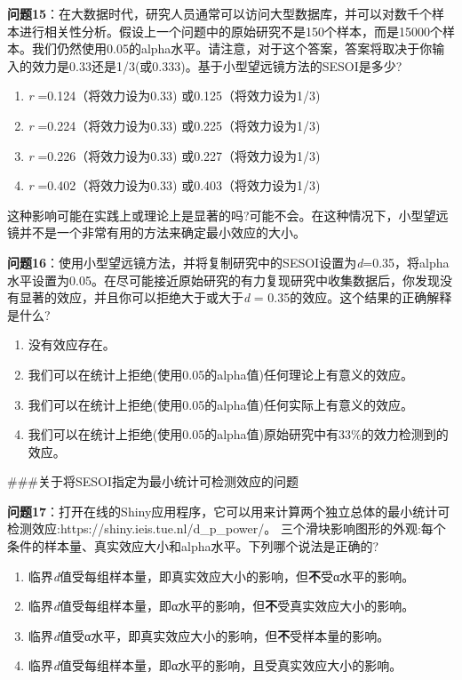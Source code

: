 \documentclass[
  letterpaper,
  DIV=11,
  numbers=noendperiod]{scrreprt}
\providecommand{\tightlist}{%
  \setlength{\itemsep}{0pt}\setlength{\parskip}{0pt}}\usepackage{longtable,booktabs,array}
\begin{document}
\textbf{问题15}：在大数据时代，研究人员通常可以访问大型数据库，并可以对数千个样本进行相关性分析。假设上一个问题中的原始研究不是150个样本，而是15000个样本。我们仍然使用0.05的alpha水平。请注意，对于这个答案，答案将取决于你输入的效力是0.33还是1/3(或0.333)。基于小型望远镜方法的SESOI是多少?

\begin{enumerate}
\def\labelenumi{\Alph{enumi})}
\tightlist
\item
  \emph{r} =0.124（将效力设为0.33) 或0.125（将效力设为1/3)
\item
  \emph{r} =0.224（将效力设为0.33) 或0.225（将效力设为1/3)
\item
  \emph{r} =0.226（将效力设为0.33) 或0.227（将效力设为1/3)
\item
  \emph{r} =0.402（将效力设为0.33) 或0.403（将效力设为1/3)
\end{enumerate}

这种影响可能在实践上或理论上是显著的吗?可能不会。在这种情况下，小型望远镜并不是一个非常有用的方法来确定最小效应的大小。

\textbf{问题16}：使用小型望远镜方法，并将复制研究中的SESOI设置为\emph{d}=0.35，将alpha水平设置为0.05。在尽可能接近原始研究的有力复现研究中收集数据后，你发现没有显著的效应，并且你可以拒绝大于或大于\emph{d}
= 0.35的效应。这个结果的正确解释是什么?

\begin{enumerate}
\def\labelenumi{\Alph{enumi})}
\tightlist
\item
  没有效应存在。
\item
  我们可以在统计上拒绝(使用0.05的alpha值)任何理论上有意义的效应。
\item
  我们可以在统计上拒绝(使用0.05的alpha值)任何实际上有意义的效应。
\item
  我们可以在统计上拒绝(使用0.05的alpha值)原始研究中有33\%的效力检测到的效应。
\end{enumerate}

\#\#\#关于将SESOI指定为最小统计可检测效应的问题

\textbf{问题17}：打开在线的Shiny应用程序，它可以用来计算两个独立总体的最小统计可检测效应:https://shiny.ieis.tue.nl/d\_p\_power/。
三个滑块影响图形的外观:每个条件的样本量、真实效应大小和alpha水平。下列哪个说法是正确的?

\begin{enumerate}
\def\labelenumi{\Alph{enumi})}
\tightlist
\item
  临界\emph{d}值受每组样本量，即真实效应大小的影响，但\textbf{不}受α水平的影响。
\item
  临界\emph{d}值受每组样本量，即α水平的影响，但\textbf{不}受真实效应大小的影响。
\item
  临界\emph{d}值受α水平，即真实效应大小的影响，但\textbf{不}受样本量的影响。
\item
  临界\emph{d}值受每组样本量，即α水平的影响，且受真实效应大小的影响。
\end{enumerate}
\end{document}
